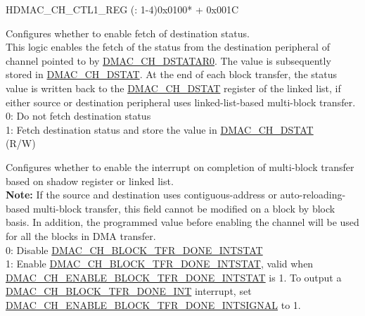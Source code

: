 \addtocounter{Regfloat}{-1}
\begin{register}{H}{DMAC\_CH\_CTL1\_REG (: 1-4)}{0x0100* + 0x001C}
\begin{regdesc}\begin{reglist}
\item [Continued from the previous page...]
\label{fielddesc:DMACCHNDSTSTATEN}\item [DMAC\_CH\regindex{n}\_DST\_STAT\_EN] Configures whether to enable fetch of destination status. \\
This logic enables the fetch of the status from the destination peripheral of channel  pointed to by \hyperref[fielddesc:DMACCHNDSTATAR0]{DMAC\_CH\_DSTATAR0}. The value is subsequently stored in \hyperref[fielddesc:DMACCHNDSTAT]{DMAC\_CH\_DSTAT}. At the end of each block transfer, the status value is written back to the \hyperref[fielddesc:DMACCHNDSTAT]{DMAC\_CH\_DSTAT} register of the linked list, if either source or destination peripheral uses linked-list-based multi-block transfer. \\
0: Do not fetch destination status \\
1: Fetch destination status and store the value in \hyperref[fielddesc:DMACCHNDSTAT]{DMAC\_CH\_DSTAT}\\
(R/W)
\label{fielddesc:DMACCHNIOCBLKTFR}\item [DMAC\_CH\regindex{n}\_IOC\_BLKTFR] Configures whether to enable the interrupt on completion of multi-block transfer based on shadow register or linked list. \\
{\bfseries Note:} If the source and destination uses contiguous-address or auto-reloading-based multi-block transfer, this field cannot be modified on a block by block basis. In addition, the programmed value before enabling the channel will be used for all the blocks in DMA transfer.\\
0: Disable \hyperref[fielddesc:DMACCHNBLOCKTFRDONEINTSTAT]{DMAC\_CH\_BLOCK\_TFR\_DONE\_INTSTAT}\\
1: Enable \hyperref[fielddesc:DMACCHNBLOCKTFRDONEINTSTAT]{DMAC\_CH\_BLOCK\_TFR\_DONE\_INTSTAT}, valid when \\\hyperref[fielddesc:DMACCHNENABLEBLOCKTFRDONEINTSTAT]{DMAC\_CH\_ENABLE\_BLOCK\_TFR\_DONE\_INTSTAT} is 1. To output a \hyperref[int:DMACCHNBLOCKTFRDONEINT]{DMAC\_CH\_BLOCK\_TFR\_DONE\_INT} interrupt, set \hyperref[fielddesc:DMACCHNENABLEBLOCKTFRDONEINTSIGNAL]{DMAC\_CH\_ENABLE\_BLOCK\_TFR\_DONE\_INTSIGNAL} to 1.\\

\end{reglist}
\end{regdesc}
\end{register}
